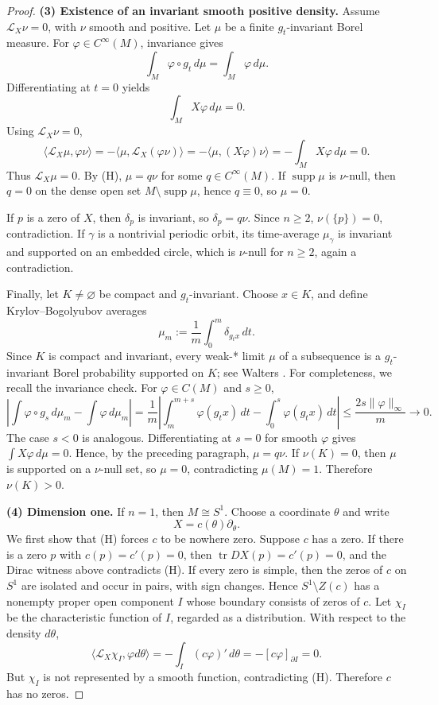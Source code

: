 \documentclass[12pt]{article}
\theoremstyle{definition}
\DeclareMathOperator{\tr}{tr}
\DeclareMathOperator{\supp}{supp}
\begin{document}
\begin{proof}
\medskip\noindent\textbf{(3) Existence of an invariant smooth positive density.}
Assume \(\mathcal L_X\nu=0\), with \(\nu\) smooth and positive.  Let \(\mu\) be a finite \(g_t\)-invariant Borel measure.  For \(\varphi\in C^\infty(M)\), invariance gives
\[
\int_M \varphi\circ g_t\,d\mu=\int_M\varphi\,d\mu.
\]
Differentiating at \(t=0\) yields
\[
\int_M X\varphi\,d\mu=0.
\]
Using \(\mathcal L_X\nu=0\),
\[
\langle \mathcal L_X\mu,\varphi\nu\rangle
=
-\langle\mu,\mathcal L_X(\varphi\nu)\rangle
=
-\langle\mu,(X\varphi)\nu\rangle
=
-\int_M X\varphi\,d\mu
=
0.
\]
Thus \(\mathcal L_X\mu=0\).  By (H), \(\mu=q\nu\) for some \(q\in C^\infty(M)\).  If \(\supp\mu\) is \(\nu\)-null, then \(q=0\) on the dense open set \(M\setminus\supp\mu\), hence \(q\equiv 0\), so \(\mu=0\).

If \(p\) is a zero of \(X\), then \(\delta_p\) is invariant, so \(\delta_p=q\nu\).  Since \(n\ge 2\), \(\nu(\{p\})=0\), contradiction.  If \(\gamma\) is a nontrivial periodic orbit, its time-average \(\mu_\gamma\) is invariant and supported on an embedded circle, which is \(\nu\)-null for \(n\ge 2\), again a contradiction.

Finally, let \(K\neq\varnothing\) be compact and \(g_t\)-invariant.  Choose \(x\in K\), and define Krylov--Bogolyubov averages
\[
\mu_m:=\frac1m\int_0^m \delta_{g_t x}\,dt .
\]
Since \(K\) is compact and invariant, every weak-* limit \(\mu\) of a subsequence is a \(g_t\)-invariant Borel probability supported on \(K\); see Walters \cite[Chapter 6]{Wa82}.  For completeness, we recall the invariance check.  For \(\varphi\in C(M)\) and \(s\ge 0\),
\[
\left|\int\varphi\circ g_s\,d\mu_m-\int\varphi\,d\mu_m\right|
=
\frac1m\left|\int_m^{m+s}\varphi(g_t x)\,dt-\int_0^s\varphi(g_t x)\,dt\right|
\le
\frac{2s\|\varphi\|_\infty}{m}\to 0.
\]
The case \(s<0\) is analogous.  Differentiating at \(s=0\) for smooth \(\varphi\) gives \(\int X\varphi\,d\mu=0\).  Hence, by the preceding paragraph, \(\mu=q\nu\).  If \(\nu(K)=0\), then \(\mu\) is supported on a \(\nu\)-null set, so \(\mu=0\), contradicting \(\mu(M)=1\).  Therefore \(\nu(K)>0\).

\medskip\noindent\textbf{(4) Dimension one.}
If \(n=1\), then \(M\cong S^1\).  Choose a coordinate \(\theta\) and write
\[
X=c(\theta)\partial_\theta .
\]
We first show that (H) forces \(c\) to be nowhere zero.  Suppose \(c\) has a zero.  If there is a zero \(p\) with \(c(p)=c'(p)=0\), then \(\tr DX(p)=c'(p)=0\), and the Dirac witness above contradicts (H).  If every zero is simple, then the zeros of \(c\) on \(S^1\) are isolated and occur in pairs, with sign changes.  Hence \(S^1\setminus Z(c)\) has a nonempty proper open component \(I\) whose boundary consists of zeros of \(c\).  Let \(\chi_I\) be the characteristic function of \(I\), regarded as a distribution.  With respect to the density \(d\theta\),
\[
\langle \mathcal L_X\chi_I,\varphi d\theta\rangle
=
-\int_I (c\varphi)'\,d\theta
=
-[c\varphi]_{\partial I}
=
0.
\]
But \(\chi_I\) is not represented by a smooth function, contradicting (H).  Therefore \(c\) has no zeros.


\end{proof}
\end{document}
